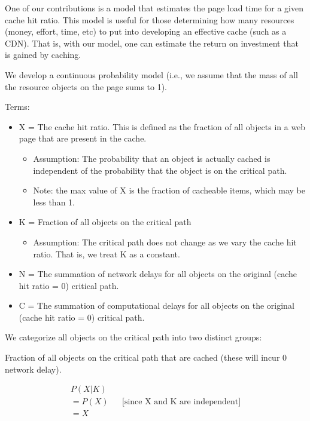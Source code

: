 One of our contributions is a model that estimates the page load time for a given cache hit ratio. This model is useful for those determining how many resources (money, effort, time, etc) to put into developing an effective cache (such as a CDN). 
That is, with our model, one can estimate the return on investment that is gained by caching.

We develop a continuous probability model (i.e., we assume that the mass of all the resource objects on the page sums to 1).


Terms:
\begin{itemize}
\item X = The cache hit ratio. This is defined as the fraction of all objects in a web page that are present in the cache.
    \begin{itemize}
    \item Assumption: The probability that an object is actually cached is independent of the probability that the object is on the critical path.
    \item Note: the max value of X is the fraction of cacheable items, which may be less than 1. 
    \end{itemize}
\item K = Fraction of all objects on the critical path
    \begin{itemize}
    \item Assumption: The critical path does not change as we vary the cache hit ratio. That is, we treat K as a constant.
    \end{itemize}
\item N = The summation of network delays for all objects on the original (cache hit ratio = 0) critical path.
\item C = The summation of computational delays for all objects on the original (cache hit ratio = 0) critical path.
\end{itemize}

We categorize all objects on the critical path into two distinct groups:

Fraction of all objects on the critical path that are cached (these will incur 0 network delay).
    
\begin{align*}
P(X|K) \\
= P(X) && \text{[since X and K are independent]} \\
= X
\end{align*}

